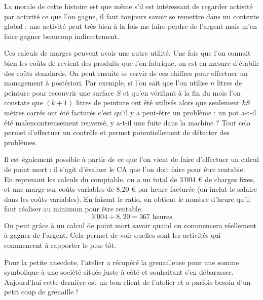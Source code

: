 La morale de cette histoire est que même s'il est intéressant 
de regarder activité par activité ce que l'on gagne, il faut 
toujours savoir se remettre dans un contexte global : une activité 
peut très bien à la fois me faire perdre de l'argent mais m'en 
faire gagner beaucoup indirectement. 

Ces calculs de marges peuvent avoir une autre utilité. 
Une fois que l'on connait bien les coûts de revient des produits que 
l'on fabrique, on est en mesure d'établir des coûts standards. 
On peut ensuite se servir de ces chiffres pour effectuer un 
management à postériori. 
Par exemple, si l'on sait que l'on utilise $n$ litres de peinture 
pour recouvrir une surface $S$ et qu'en vérifiant à la fin du mois 
l'on constate que $(k+1)$ litres de peinture ont été utilisés alors que 
seulement $kS$ mètres carrés ont été facturés c'est qu'il y a peut-être 
un problème : un pot a-t-il été malencontreusement renversé, y a-t-il une 
fuite dans la machine ?
Tout cela permet d'effectuer un contrôle et permet potentiellement de 
détecter des problèmes.

Il est également possible à partir de ce que l'on vient de faire 
d'effectuer un calcul de point mort : il s'agit d'évaluer le CA 
que l'on doit faire pour être rentable. \\
En reprenant les calculs du comptable, on a un total de 3'004 \euro\/ 
de charges fixes, et une marge sur coûts variables de 8,20 \euro\/ par heure facturée
(on inclut le salaire dans les coûts variables). En faisant le ratio, 
on obtient le nombre d'heure qu'il faut réaliser au minimum pour être rentable.
\[
3\text{'}004 \div 8,20 = 367 \text{ heures}
\]
On peut grâce à un calcul de point mort savoir quand on commencera réellement 
à gagner de l'argent. Cela permet de voir quelles sont les activités qui 
commencent à rapporter le plus tôt.

Pour la petite anecdote, l'atelier a récupéré la grenailleuse 
pour une somme symbolique  
à une société située juste à côté et souhaitant s'en débarasser. 
Aujourd'hui cette dernière est un bon client de l'atelier et 
a parfois besoin d'un petit coup de grenaille !